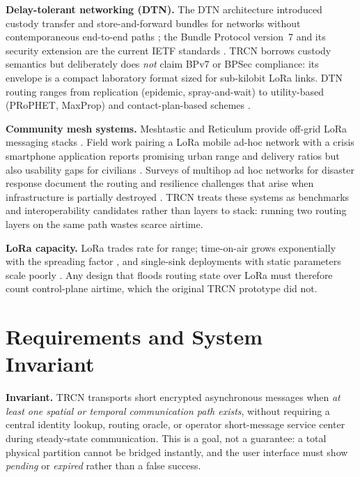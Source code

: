 \documentclass[jou,a4paper,11pt,floatsintext]{apa7}
\begin{document}
\textbf{Delay-tolerant networking (DTN).} The DTN architecture introduced custody transfer and store-and-forward bundles for networks without contemporaneous end-to-end paths \parencite{fall2003}; the Bundle Protocol version~7 and its security extension are the current IETF standards \parencite{rfc9171,rfc9172}. TRCN borrows custody semantics but deliberately does \emph{not} claim BPv7 or BPSec compliance: its envelope is a compact laboratory format sized for sub-kilobit LoRa links. DTN routing ranges from replication (epidemic, spray-and-wait) to utility-based (PRoPHET, MaxProp) and contact-plan-based schemes \parencite{vahdat2000,spyropoulos2005,lindgren2003,burgess2006,fraire2021}.

\textbf{Community mesh systems.} Meshtastic and Reticulum provide off-grid LoRa messaging stacks \parencite{meshtastic,reticulum}. Field work pairing a LoRa mobile ad-hoc network with a crisis smartphone application reports promising urban range and delivery ratios but also usability gaps for civilians \parencite{khamaisi2025}. Surveys of multihop ad hoc networks for disaster response document the routing and resilience challenges that arise when infrastructure is partially destroyed \parencite{reina2015}. TRCN treats these systems as benchmarks and interoperability candidates rather than layers to stack: running two routing layers on the same path wastes scarce airtime.

\textbf{LoRa capacity.} LoRa trades rate for range; time-on-air grows exponentially with the spreading factor \parencite{semtech2013,augustin2016}, and single-sink deployments with static parameters scale poorly \parencite{bor2016,adelantado2017}. Any design that floods routing state over LoRa must therefore count control-plane airtime, which the original TRCN prototype did not.

\section{Requirements and System Invariant}
\label{sec:req}

\textbf{Invariant.} TRCN transports short encrypted asynchronous messages when \emph{at least one spatial or temporal communication path exists}, without requiring a central identity lookup, routing oracle, or operator short-message service center during steady-state communication. This is a goal, not a guarantee: a total physical partition cannot be bridged instantly, and the user interface must show \emph{pending} or \emph{expired} rather than a false success.
\end{document}
